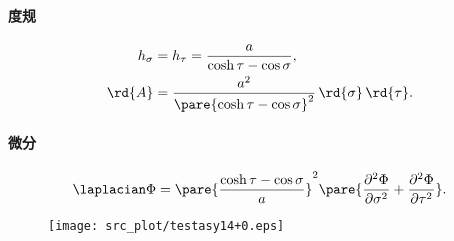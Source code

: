 \documentclass{article}
\begin{document}

\paragraph{度规} %
\label{par:度规}

\begin{align*}
    h_\sigma &= h_\tau = \frac{a}{\cosh \tau - \cos \sigma}, \\ \rd{A} &= \frac{a^2}{\pare{\cosh \tau - \cos\sigma}^2}\,\rd{\sigma}\,\rd{\tau}.
\end{align*}


\paragraph{微分} %
\label{par:微分}

\begin{align*}
    \laplacian \Phi = \pare{\frac{\cosh \tau - \cos\sigma}{a}}^2 \pare{\frac{\partial^2\Phi}{\partial \sigma^2} + \frac{\partial^2\Phi}{\partial\tau^2}}.
\end{align*}


\begin{figure}
    \centering
    \texttt{[image: src\_plot/testasy14+0.eps]}
\end{figure}



\end{document}
